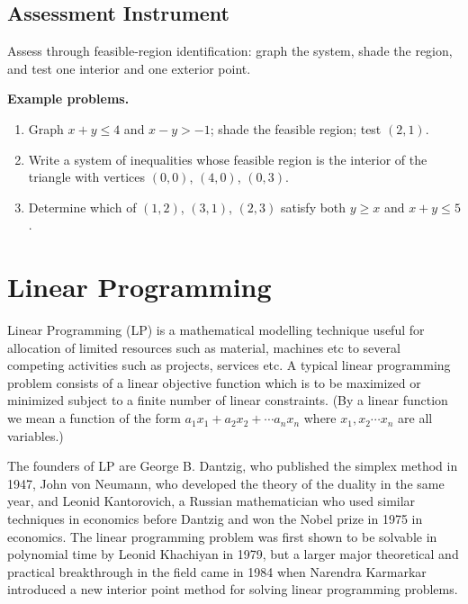 \subsection{Assessment Instrument}
\label{ssec:asse-3669}


Assess through feasible-region identification: graph the system, shade
the region, and test one interior and one exterior point.

\textbf{Example problems.}
\begin{enumerate}
    \item Graph $x+y\leq4$ and $x-y>-1$; shade the feasible region;
          test $(2,1)$.
    \item Write a system of inequalities whose feasible region is the
          interior of the triangle with vertices $(0,0)$, $(4,0)$,
          $(0,3)$.
    \item Determine which of $(1,2)$, $(3,1)$, $(2,3)$ satisfy
          both $y\geq x$ and $x+y\leq5$.
\end{enumerate}



\section{Linear Programming}
\label{sec:line-1d66}


Linear Programming (LP) is a mathematical modelling technique useful for allocation of
limited resources such as material, machines etc to several competing activities such as
projects, services etc. A typical linear programming problem consists of a linear
objective function which is to be maximized or minimized subject to a finite number of
linear constraints. (By a linear function we mean a function of the form $a _1x _1+a _2x
_2+\cdots a _nx _n$ where $x _1,x _2\cdots x _n$ are all variables.)



The founders of LP are George B. Dantzig, who published the simplex method in 1947, John
von Neumann, who developed the theory of the duality in the same year, and Leonid
Kantorovich, a Russian mathematician who used similar techniques in economics before
Dantzig and won the Nobel prize in 1975 in economics. The linear programming problem was
first shown to be solvable in polynomial time by Leonid Khachiyan in 1979, but a larger
major theoretical and practical breakthrough in the field came in 1984 when Narendra
Karmarkar introduced a new interior point method for solving linear programming problems.




